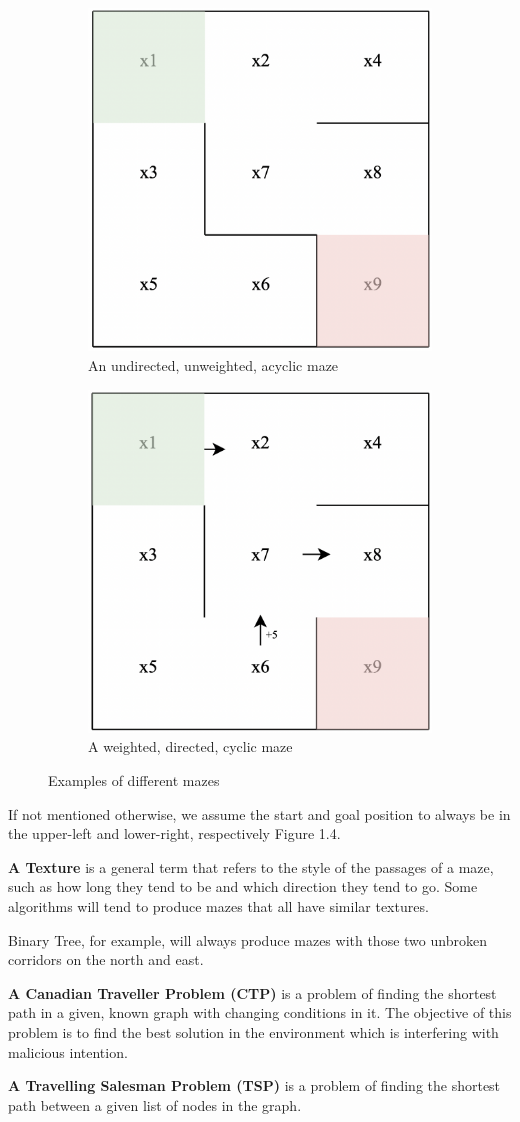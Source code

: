  \newline
 \begin{figure}[h]
	\centering
	\begin{subfigure}{.5\textwidth}
	  \centering
	  \includegraphics[width=.4\linewidth]{undirected_maze}
	  \caption{An undirected, unweighted, acyclic maze}
	  \label{fig:sub1}
	\end{subfigure}
	\begin{subfigure}{.5\textwidth}
	  \centering
	  \includegraphics[width=.4\linewidth]{cyclic_maze}
	  \caption{A weighted, directed, cyclic maze}
	  \label{fig:sub2}
	\end{subfigure}
	\caption{Examples of different mazes}
	\label{fig:test}
	\end{figure}
If not mentioned otherwise, we assume the start and goal position to always be in the upper-left and lower-right, respectively Figure 1.4.
\newline	
 \begin{definition}\textbf{A Texture} is a general term that refers to the style of the passages of a maze, such as how long they tend to be and which direction they tend to go. Some algorithms will tend to produce mazes that all have similar textures.\cite{mazes}\end{definition}

 Binary Tree, for example, will always produce mazes with those two unbroken corridors on the north and east.
\begin{definition}\textbf{A Canadian Traveller Problem (CTP)} is a problem of finding the shortest path in a given, known graph with changing conditions in it. The objective of this problem is to find the best solution in the environment which is interfering with malicious intention.\end{definition}
\begin{definition}\textbf{A Travelling Salesman Problem (TSP)} is a problem of finding the shortest path between a given list of nodes in the graph. \end{definition}


